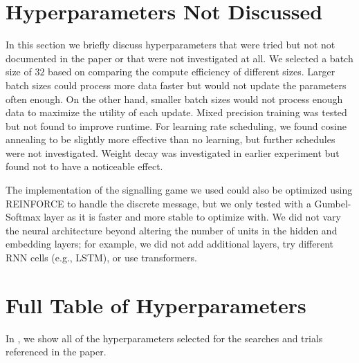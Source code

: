 \section{Hyperparameters Not Discussed}
\unskip\label{hpo:sec:not-discussed}
In this section we briefly discuss hyperparameters that were tried but not not documented in the paper or that were not investigated at all.
We selected a batch size of $32$ based on comparing the compute efficiency of different sizes.
Larger batch sizes could process more data faster but would not update the parameters often enough.
On the other hand, smaller batch sizes would not process enough data to maximize the utility of each update.
Mixed precision training was tested but not found to improve runtime.
For learning rate scheduling, we found cosine annealing to be slightly more effective than no learning, but further schedules were not investigated.
Weight decay was investigated in earlier experiment but found not to have a noticeable effect.

The implementation of the signalling game we used could also be optimized using REINFORCE to handle the discrete message, but we only tested with a Gumbel-Softmax layer as it is faster and more stable to optimize with.
We did not vary the neural architecture beyond altering the number of units in the hidden and embedding layers; for example, we did not add additional layers, try different RNN cells (e.g., LSTM), or use transformers.


\section{Full Table of Hyperparameters}
\unskip\label{hpo:sec:all-hparams}

In , we show all of the hyperparameters selected for the searches and trials referenced in the paper.

